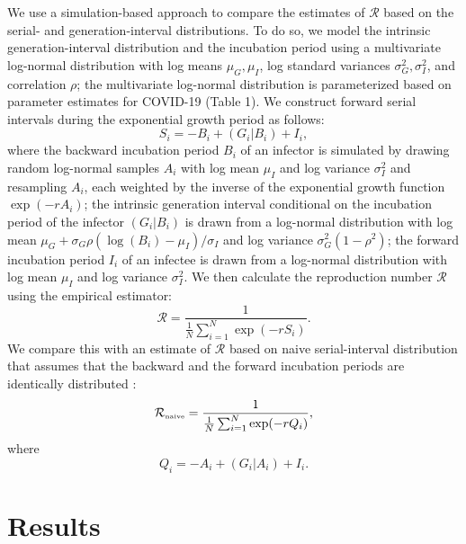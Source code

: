 \documentclass[12pt]{article}
\begin{document}
We use a simulation-based approach to compare the estimates of $\mathcal R$ based on the serial- and generation-interval distributions. 
To do so, we model the intrinsic generation-interval distribution and the incubation period using a multivariate log-normal distribution with log means $\mu_G, \mu_I$, log standard variances $\sigma_G^2, \sigma_I^2$, and correlation $\rho$;
the multivariate log-normal distribution is parameterized based on parameter estimates for COVID-19 (Table 1).
We construct forward serial intervals during the exponential growth period as follows:
\begin{equation}
S_i = -B_i + (G_i|B_i) + I_i,
\end{equation}
where the backward incubation period $B_i$ of an infector is simulated by drawing random log-normal samples $A_i$ with log mean $\mu_I$ and log variance $\sigma_I^2$ and resampling $A_i$, each weighted by the inverse of the exponential growth function $\exp(-rA_i)$;
the intrinsic generation interval conditional on the incubation period of the infector $(G_i|B_i)$ is drawn from a log-normal distribution with log mean $\mu_G + \sigma_G \rho (\log(B_i) - \mu_I)/\sigma_I$ and log variance $\sigma_G^2 (1-\rho^2)$;
the forward incubation period $I_i$ of an infectee is drawn from a log-normal distribution with log mean $\mu_I$ and log variance $\sigma_I^2$.
We then calculate the reproduction number $\mathcal R$ using the empirical estimator:
\begin{equation}
\mathcal R = \frac{1}{\frac{1}{N}\sum_{i=1}^N \exp(- r S_i)}.
\end{equation}
We compare this with an estimate of $\mathcal R$ based on naive serial-interval distribution that assumes that the backward and the forward incubation periods are identically distributed \citep{svensson2007note,klinkenberg2011correlation,champredon2018equivalence, britton2019estimation}:
\begin{equation}
{\mathcal R}_{\textrm{\tiny naive}} = \frac{1}{\frac{1}{N}\sum_{i=1}^N \exp(- r Q_i)},
\end{equation}
where
\begin{equation}
Q_i = -A_i + (G_i|A_i) + I_i.
\end{equation}

\section{Results}
\end{document}
